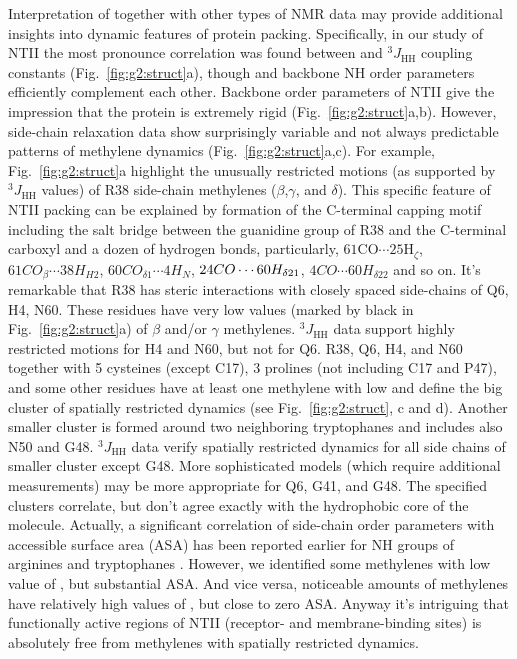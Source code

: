 \documentclass[twocolumn]{svjour3}           %
\begin{document}
Interpretation of \gtwoCH{} together with other types of NMR data
may provide additional insights into dynamic features of protein packing.
Specifically, in our study of NTII the most pro\-no\-unce correlation was found between
\gtwoCH{} and $^3\!J_\text{HH}$ coupling constants 
(Fig.~\ref{fig:g2:struct}a), though \gtwoCH{} and backbone NH order
parameters efficiently complement each other. Backbone order parameters 
of NTII give the impression that the protein is extremely rigid 
(Fig.~\ref{fig:g2:struct}a,b). However, side-chain relaxation 
data show surprisingly variable and not always predictable patterns 
of methylene dynamics (Fig.~\ref{fig:g2:struct}a,c). 
For example, Fig.~\ref{fig:g2:struct}a highlight the unusually 
restricted  motions (as supported by $^3\!J_\text{HH}$ values) of R38 side-chain methylenes ($\beta$,$\gamma$, 
and $\delta$). This specific feature of NTII packing can be explained 
by formation of the C-terminal capping motif including the salt bridge between 
the guanidine group of R38 and the C-terminal carboxyl and a dozen of hydrogen bonds, particularly, $61 \allowbreak \text{CO} \allowbreak \cdots 25\text{H}_\zeta$, $61CO_\beta\cdots38H_{H2}$, $60CO_{\delta1}\cdots4H_N$,
$24\-CO\cdots60H_{\delta21}$, $4CO\cdots60H_{\delta22}$ and so on.
It's remarkable that R38 has steric interactions with closely spaced 
side-chains of Q6, H4, N60. These  
residues have very low \gtwoCH{} values (marked by black in Fig.~\ref{fig:g2:struct}a) of $\beta$ and/or 
$\gamma$ methylenes. $^3\!J_\text{HH}$ data support highly restricted motions for H4 and N60, but not for Q6. R38, Q6, H4, and N60 together 
with 5 cysteines (except C17), 3 prolines (not including C17 and P47), and some 
other residues have at least one methylene with low \gtwoCH{} and 
define the big cluster of spatially restricted dynamics (see
Fig.~\ref{fig:g2:struct}, c and d). Another smaller cluster is formed 
around two neighboring tryptophanes and includes also N50 and G48.  $^3\!J_\text{HH}$ data verify spatially restricted dynamics for all side chains of smaller cluster except G48. More sophisticated models (which require additional measurements) may be more appropriate for Q6, G41, and G48.
The specified clusters correlate, but don't agree exactly with the 
hydrophobic core of the molecule. Actually, a significant correlation 
of side-chain order parameters with accessible surface area (ASA) 
has been reported earlier for NH groups of arginines and tryptophanes
\cite{buck_structural_1995}. However, we identified some methylenes 
with low value of \gtwoCH{}, but substantial ASA. And vice versa, 
noticeable amounts of methylenes have relatively high values of 
\gtwoCH{}, but close to zero ASA. Anyway it's intriguing that 
functionally active regions of NTII (receptor- and membrane-binding 
sites) is absolutely free from methylenes with spatially restricted dynamics.
\end{document}
